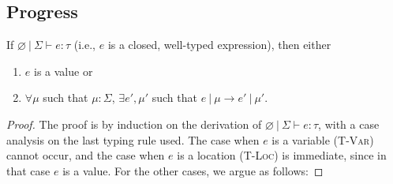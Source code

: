 \documentclass{llncs}
\begin{document}
\subsection{Progress}

\begin{theorem}[Progress]
If $\varnothing~|~\Sigma \vdash e : \tau$ (i.e., $e$ is a closed, well-typed expression), then either
\begin{enumerate}
\item $e$ is a value or
\item $\forall \mu$ such that $\mu : \Sigma$,
   $\exists e', \mu'$ such that $e~|~\mu \longrightarrow e'~|~\mu'$.
\end{enumerate}
\end{theorem}
\begin{proof} The proof is by induction on the derivation of $\varnothing~|~\Sigma \vdash e : \tau$, with a case analysis on the last typing rule used. The case when $e$ is a variable (\textsc{T-Var}) cannot occur, and the case when $e$ is a location (\textsc{T-Loc}) is immediate, since in that case $e$ is a value. For the other cases, we argue as follows:


\end{proof}
\end{document}
